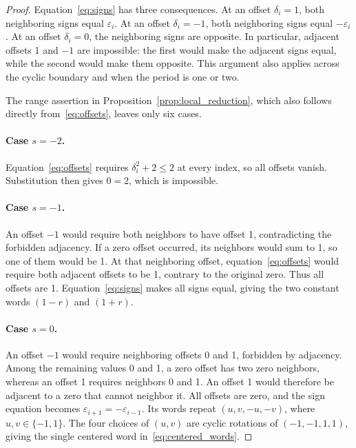 \begin{proof}
Equation~\eqref{eq:signs} has three consequences. At an offset
\(\delta_i=1\), both neighboring signs equal \(\varepsilon_i\).
At an offset \(\delta_i=-1\), both neighboring signs equal
\(-\varepsilon_i\). At an offset \(\delta_i=0\), the neighboring
signs are opposite. In particular, adjacent offsets 1 and \(-1\) are
impossible: the first would make the adjacent signs equal, while the
second would make them opposite. This argument also applies across
the cyclic boundary and when the period is one or two.

The range assertion in Proposition~\ref{prop:local_reduction}, which
also follows directly from~\eqref{eq:offsets}, leaves only six cases.

\paragraph{Case \(s=-2\).}
Equation~\eqref{eq:offsets} requires \(\delta_i^2+2\le2\) at every
index, so all offsets vanish. Substitution then gives \(0=2\), which
is impossible.

\paragraph{Case \(s=-1\).}
An offset \(-1\) would require both neighbors to have offset 1,
contradicting the forbidden adjacency. If a zero offset occurred, its
neighbors would sum to 1, so one of them would be 1. At that neighboring
offset, equation~\eqref{eq:offsets} would require both adjacent offsets
to be 1, contrary to the original zero. Thus all offsets are 1.
Equation~\eqref{eq:signs} makes all signs equal, giving the two
constant words \((1-r)\) and \((1+r)\).

\paragraph{Case \(s=0\).}
An offset \(-1\) would require neighboring offsets 0 and 1, forbidden
by adjacency. Among the remaining values 0 and 1, a zero offset has two
zero neighbors, whereas an offset 1 requires neighbors 0 and 1. An
offset 1 would therefore be adjacent to a zero that cannot neighbor it.
All offsets are zero, and the sign equation becomes
\(\varepsilon_{i+1}=-\varepsilon_{i-1}\). Its words repeat
\((u,v,-u,-v)\), where \(u,v\in\{-1,1\}\). The four choices of
\((u,v)\) are cyclic rotations of \((-1,-1,1,1)\), giving the single
centered word in~\eqref{eq:centered_words}.


\end{proof}
